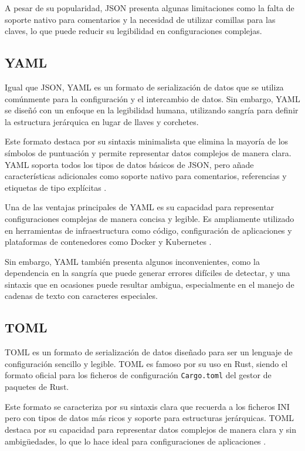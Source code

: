 A pesar de su popularidad, \ac{JSON} presenta algunas limitaciones como la falta de soporte nativo para comentarios y la necesidad de utilizar comillas para las claves, lo que puede reducir su legibilidad en configuraciones complejas.

\subsection{\acs{YAML}}

Igual que \ac{JSON}, \ac{YAML} es un formato de serialización de datos que se utiliza comúnmente para la configuración y el intercambio de datos. Sin embargo, \ac{YAML} se diseñó con un enfoque en la legibilidad humana, utilizando sangría para definir la estructura jerárquica en lugar de llaves y corchetes.

Este formato destaca por su sintaxis minimalista que elimina la mayoría de los símbolos de puntuación y permite representar datos complejos de manera clara. \ac{YAML} soporta todos los tipos de datos básicos de \ac{JSON}, pero añade características adicionales como soporte nativo para comentarios, referencias y etiquetas de tipo explícitas \autocite{YAMLAintMarkup}.

Una de las ventajas principales de \ac{YAML} es su capacidad para representar configuraciones complejas de manera concisa y legible. Es ampliamente utilizado en herramientas de infraestructura como código, configuración de aplicaciones y plataformas de contenedores como Docker y Kubernetes \autocite{FicheroDockercomposeyml,february2024YAMLBasicsKubernetes}.

Sin embargo, \ac{YAML} también presenta algunos inconvenientes, como la dependencia en la sangría que puede generar errores difíciles de detectar, y una sintaxis que en ocasiones puede resultar ambigua, especialmente en el manejo de cadenas de texto con caracteres especiales.

\subsection{\acs{TOML}}

\ac{TOML} es un formato de serialización de datos diseñado para ser un lenguaje de configuración sencillo y legible. \ac{TOML} es famoso por su uso en Rust, siendo el formato oficial para los ficheros de configuración \texttt{Cargo.toml} del gestor de paquetes de Rust.

Este formato se caracteriza por su sintaxis clara que recuerda a los ficheros INI pero con tipos de datos más ricos y soporte para estructuras jerárquicas. \ac{TOML} destaca por su capacidad para representar datos complejos de manera clara y sin ambigüedades, lo que lo hace ideal para configuraciones de aplicaciones \autocite{TOMLEnglishV100}.

